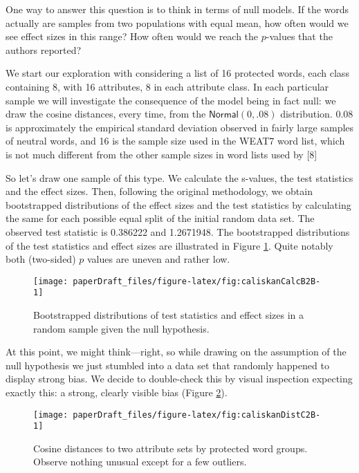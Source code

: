 \documentclass[
  12pt,
  dvipsnames,enabledeprecatedfontcommands]{scrartcl}
\begin{document}
One way to answer this question is to think in terms of null models. If
the words actually are samples from two populations with equal mean, how
often would we see effect sizes in this range? How often would we reach
the \(p\)-values that the authors reported?

We start our exploration with considering a list of 16 protected words,
each class containing 8, with 16 attributes, 8 in each attribute class.
In each particular sample we will investigate the consequence of the
model being in fact null: we draw the cosine distances, every time, from
the \(\mathsf{Normal}(0,.08)\) distribution. \(0.08\) is approximately
the empirical standard deviation observed in fairly large samples of
neutral words, and 16 is the sample size used in the WEAT7 word list,
which is not much different from the other sample sizes in word lists
used by {[}8{]}

So let's draw one sample of this type. We calculate the s-values, the
test statistics and the effect sizes. Then, following the original
methodology, we obtain bootstrapped distributions of the effect sizes
and the test statistics by calculating the same for each possible equal
split of the initial random data set. The observed test statistic is
0.386222 and 1.2671948. The bootstrapped distributions of the test
statistics and effect sizes are illustrated in Figure
\ref{fig:caliskanCalc}. Quite notably both (two-sided) \(p\) values are
uneven and rather low.

\begin{figure}[H]

\begin{center}\texttt{[image: paperDraft\_files/figure-latex/fig:caliskanCalcB2B-1]} \end{center}

\caption{Bootstrapped distributions of test statistics and effect sizes in a random sample given the null hypothesis.}
\label{fig:caliskanCalc}
\end{figure}

At this point, we might think---right, so while drawing on the
assumption of the null hypothesis we just stumbled into a data set that
randomly happened to display strong bias. We decide to double-check this
by visual inspection expecting exactly this: a strong, clearly visible
bias (Figure \ref{fig:caliskanDistances}).

\begin{figure}[H]

\begin{center}\texttt{[image: paperDraft\_files/figure-latex/fig:caliskanDistC2B-1]} \end{center}

\caption{Cosine distances to two attribute sets by protected word groups. Observe nothing unusual except for a few outliers.}
\label{fig:caliskanDistances}
\end{figure}
\end{document}
